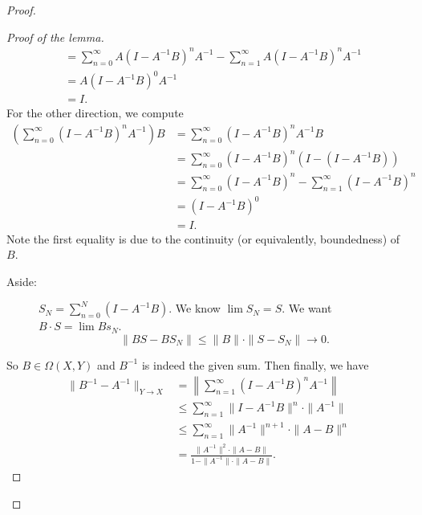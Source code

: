 \documentclass[12pt]{article}
\theoremstyle{plain}
\theoremstyle{definition}
\begin{document}
\begin{proof}
\begin{description}
\begin{proof}[Proof of the lemma]
\[\begin{aligned}
                    &=\sum_{n=0}^\infty A(I-A^{-1}B)^nA^{-1} - \sum_{n=1}^\infty A(I-A^{-1}B)^nA^{-1}\\
                    &=A(I-A^{-1}B)^0A^{-1}\\
                    &=I.
                \end{aligned}\]
                For the other direction, we compute
                \[\begin{aligned}
                        \left(\sum_{n=0}^\infty (I-A^{-1}B)^nA^{-1}\right)B
                        &= \sum_{n=0}^\infty (I-A^{-1}B)^n A^{-1}B\\
                        &=\sum_{n=0}^\infty (I-A^{-1}B)^n(I-(I-A^{-1}B))\\
                        &=\sum_{n=0}^\infty (I-A^{-1}B)^n - \sum_{n=1}^\infty (I-A^{-1}B)^n\\
                        &=(I-A^{-1}B)^0\\
                        &=I.
                \end{aligned}\]
                Note the first equality is due to the continuity (or equivalently, boundedness) of $B$.
                \begin{description}
                    \item[Aside: ]
                        $S_N=\sum_{n=0}^N(I-A^{-1}B)$.
                        We know $\lim S_N=S$.
                        We want $B\cdot S=\lim Bs_N$.
                        \[
                            \|BS-BS_N\| \leq \|B\|\cdot\|S-S_N\| \rightarrow 0.
                        \]
                \end{description}
                So $B\in\Omega(X,Y)$ and $B^{-1}$ is indeed the given sum.
                Then finally, we have
                \[
                    \begin{aligned}
                        \|B^{-1}-A^{-1}\|_{Y\rightarrow X}
                        &=\left\|\sum_{n=1}^\infty (I-A^{-1}B)^nA^{-1}\right\|\\
                        &\leq \sum_{n=1}^\infty \|I-A^{-1}B\|^n\cdot\|A^{-1}\|\\
                        &\leq \sum_{n=1}^\infty \|A^{-1}\|^{n+1}\cdot\|A-B\|^n\\
                        &=\frac{\|A^{-1}\|^2\cdot\|A-B\|}{1-\|A^{-1}\|\cdot\|A-B\|}.
                    \end{aligned}
                \]
            \end{proof}
    \end{description}
\end{proof}
\end{document}
